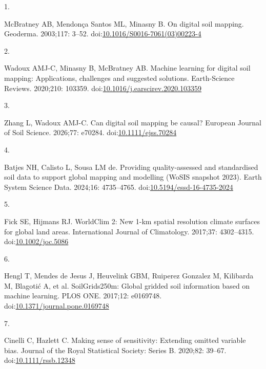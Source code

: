 \documentclass[10pt,letterpaper]{article}
\newlength{\cslhangindent}
\newlength{\csllabelwidth}
\newenvironment{CSLReferences}[2] %
 {\begin{list}{}{%
  \setlength{\itemindent}{0pt}
  \setlength{\leftmargin}{0pt}
  \setlength{\parsep}{0pt}
  \ifodd #1
   \setlength{\leftmargin}{\cslhangindent}
   \setlength{\itemindent}{-1\cslhangindent}
  \fi
  \setlength{\itemsep}{#2\baselineskip}}}
 {\end{list}}
\newcommand{\CSLLeftMargin}[1]{\parbox[t]{\csllabelwidth}{#1}}
\newcommand{\CSLRightInline}[1]{\parbox[t]{\linewidth - \csllabelwidth}{#1}\break}
\begin{document}
\protect{}\label{refs}
\begin{CSLReferences}{0}{1}
\CSLLeftMargin{1. }%
\CSLRightInline{McBratney AB, Mendonça Santos ML, Minasny B. On digital
soil mapping. Geoderma. 2003;117: 3--52.
doi:\href{https://doi.org/10.1016/S0016-7061(03)00223-4}{10.1016/S0016-7061(03)00223-4}}

\CSLLeftMargin{2. }%
\CSLRightInline{Wadoux AMJ-C, Minasny B, McBratney AB. Machine learning
for digital soil mapping: Applications, challenges and suggested
solutions. Earth-Science Reviews. 2020;210: 103359.
doi:\href{https://doi.org/10.1016/j.earscirev.2020.103359}{10.1016/j.earscirev.2020.103359}}

\CSLLeftMargin{3. }%
\CSLRightInline{Zhang L, Wadoux AMJ-C. Can digital soil mapping be
causal? European Journal of Soil Science. 2026;77: e70284.
doi:\href{https://doi.org/10.1111/ejss.70284}{10.1111/ejss.70284}}

\CSLLeftMargin{4. }%
\CSLRightInline{Batjes NH, Calisto L, Sousa LM de. Providing
quality-assessed and standardised soil data to support global mapping
and modelling ({WoSIS} snapshot 2023). Earth System Science Data.
2024;16: 4735--4765.
doi:\href{https://doi.org/10.5194/essd-16-4735-2024}{10.5194/essd-16-4735-2024}}

\CSLLeftMargin{5. }%
\CSLRightInline{Fick SE, Hijmans RJ. {WorldClim 2}: New 1-km spatial
resolution climate surfaces for global land areas. International Journal
of Climatology. 2017;37: 4302--4315.
doi:\href{https://doi.org/10.1002/joc.5086}{10.1002/joc.5086}}

\CSLLeftMargin{6. }%
\CSLRightInline{Hengl T, Mendes de Jesus J, Heuvelink GBM, Ruiperez
Gonzalez M, Kilibarda M, Blagotić A, et al. {SoilGrids250m}: Global
gridded soil information based on machine learning. PLOS ONE. 2017;12:
e0169748.
doi:\href{https://doi.org/10.1371/journal.pone.0169748}{10.1371/journal.pone.0169748}}

\CSLLeftMargin{7. }%
\CSLRightInline{Cinelli C, Hazlett C. Making sense of sensitivity:
Extending omitted variable bias. Journal of the Royal Statistical
Society: Series B. 2020;82: 39--67.
doi:\href{https://doi.org/10.1111/rssb.12348}{10.1111/rssb.12348}}

\end{CSLReferences}

\nolinenumbers
\end{document}
